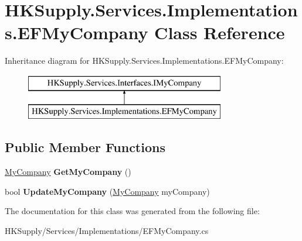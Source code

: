 \hypertarget{class_h_k_supply_1_1_services_1_1_implementations_1_1_e_f_my_company}{}\section{H\+K\+Supply.\+Services.\+Implementations.\+E\+F\+My\+Company Class Reference}
\label{class_h_k_supply_1_1_services_1_1_implementations_1_1_e_f_my_company}
Inheritance diagram for H\+K\+Supply.\+Services.\+Implementations.\+E\+F\+My\+Company\+:\begin{figure}[H]
\begin{center}
\leavevmode
\includegraphics[height=2.000000cm]{class_h_k_supply_1_1_services_1_1_implementations_1_1_e_f_my_company}
\end{center}
\end{figure}
\subsection*{Public Member Functions}
\begin{DoxyCompactItemize}
\item 
\mbox{\label{class_h_k_supply_1_1_services_1_1_implementations_1_1_e_f_my_company_a3c25540aef1e67e820e6dae4c4434b12}} 
\mbox{\hyperlink{class_h_k_supply_1_1_models_1_1_my_company}{My\+Company}} {\bfseries Get\+My\+Company} ()
\item 
\mbox{\label{class_h_k_supply_1_1_services_1_1_implementations_1_1_e_f_my_company_aa9abd8a86d91700c1a58c10cf5535178}} 
bool {\bfseries Update\+My\+Company} (\mbox{\hyperlink{class_h_k_supply_1_1_models_1_1_my_company}{My\+Company}} my\+Company)
\end{DoxyCompactItemize}


The documentation for this class was generated from the following file\+:\begin{DoxyCompactItemize}
\item 
H\+K\+Supply/\+Services/\+Implementations/E\+F\+My\+Company.\+cs\end{DoxyCompactItemize}
